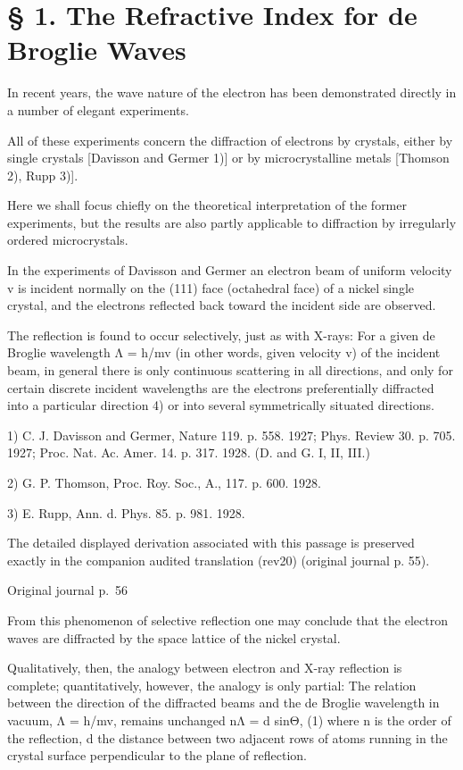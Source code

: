 \documentclass[10pt]{article}
\newcommand{\origpage}[1]{\par\medskip\noindent\hfill{\small\color{notegray}Original journal p.~#1}\hfill\mbox{}\par\smallskip}
\begin{document}
\section*{§ 1. The Refractive Index for de Broglie Waves}
In recent years, the wave nature of the electron has been demonstrated directly in a number of elegant experiments.\par
All of these experiments concern the diffraction of electrons by crystals, either by single crystals [Davisson and Germer 1)] or by microcrystalline metals [Thomson 2), Rupp 3)].\par
Here we shall focus chiefly on the theoretical interpretation of the former experiments, but the results are also partly applicable to diffraction by irregularly ordered microcrystals.\par
In the experiments of Davisson and Germer an electron beam of uniform velocity v is incident normally on the (111) face (octahedral face) of a nickel single crystal, and the electrons reflected back toward the incident side are observed.\par
The reflection is found to occur selectively, just as with X-rays: For a given de Broglie wavelength Λ = h/mv (in other words, given velocity v) of the incident beam, in general there is only continuous scattering in all directions, and only for certain discrete incident wavelengths are the electrons preferentially diffracted into a particular direction 4) or into several symmetrically situated directions.\par
\noindent\footnotesize 1) C. J. Davisson and Germer, Nature 119. p. 558. 1927; Phys. Review 30. p. 705. 1927; Proc. Nat. Ac. Amer. 14. p. 317. 1928. (D. and G. I, II, III.)\par\normalsize
\noindent\footnotesize 2) G. P. Thomson, Proc. Roy. Soc., A., 117. p. 600. 1928.\par\normalsize
\noindent\footnotesize 3) E. Rupp, Ann. d. Phys. 85. p. 981. 1928.\par\normalsize
The detailed displayed derivation associated with this passage is preserved exactly in the companion audited translation (rev20) (original journal p. 55).\par
\origpage{56}
From this phenomenon of selective reflection one may conclude that the electron waves are diffracted by the space lattice of the nickel crystal.\par
Qualitatively, then, the analogy between electron and X-ray reflection is complete; quantitatively, however, the analogy is only partial: The relation between the direction of the diffracted beams and the de Broglie wavelength in vacuum, Λ = h/mv, remains unchanged nΛ = d sinΘ, (1) where n is the order of the reflection, d the distance between two adjacent rows of atoms running in the crystal surface perpendicular to the plane of reflection.\par
\end{document}
